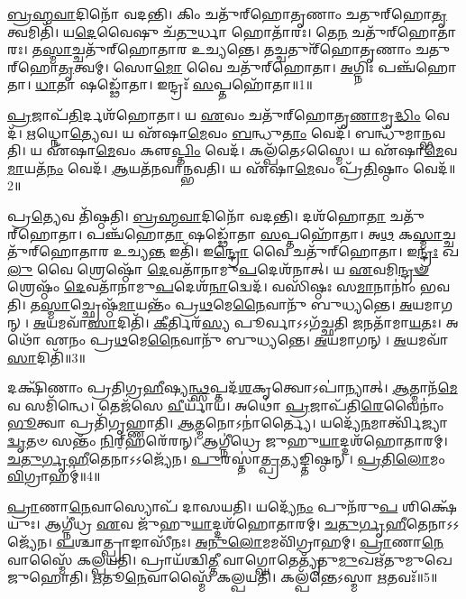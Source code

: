 \setcounter{anuvakam}{0}

\-\ul{𑌬𑍍𑌰}\-\-\ul{𑌹𑍍𑌮}\-\-\ul{𑌵𑌾}\-𑌦𑌿𑌨𑍋᳴ 𑌵𑌦𑌨𑍍𑌤𑌿।
𑌕𑌿𑌂 𑌚𑌤𑍁᳴𑌰𑍍‌\mbox{}𑌹𑍋𑌤𑍃𑌣𑌾𑌂 𑌚𑌤𑍁𑌰𑍍‌\mbox{}𑌹𑍋\-\ul{𑌤𑍃}\-𑌤𑍍𑌵𑌮𑌿𑌤𑌿᳴।
𑌯\-\ul{𑌦𑍇}\-𑌵𑍈𑌷𑍁 𑌚᳴\-\ul{𑌤𑍁}\-𑌰𑍍𑌧𑌾 𑌹𑍋𑌤𑌾᳴𑌰𑌃।
𑌤𑍇\-\ul{𑌨} 𑌚𑌤𑍁᳴𑌰𑍍‌\mbox{}𑌹𑍋𑌤𑌾𑌰𑌃।
𑌤\-\ul{𑌸𑍍𑌮𑌾}\-𑌚𑍍𑌚𑌤𑍁᳴𑌰𑍍‌\mbox{}𑌹𑍋𑌤𑌾𑌰 𑌉𑌚𑍍𑌯𑌨𑍍𑌤𑍇।
𑌤𑌚𑍍𑌚𑌤𑍁𑌰𑍍᳴𑌹𑍋𑌤𑍃𑌣𑌾𑌂 𑌚𑌤𑍁𑌰𑍍‌\mbox{}𑌹𑍋\-\ul{𑌤𑍃}\-𑌤𑍍𑌵𑌮𑍍।
𑌸𑍋\-\ul{𑌮𑍋} 𑌵𑍈 𑌚𑌤𑍁᳴𑌰𑍍‌\mbox{}𑌹𑍋𑌤𑌾।
\-\ul{𑌅}\-𑌗𑍍𑌨𑌿𑌃 𑌪𑌞𑍍𑌚᳴𑌹𑍋𑌤𑌾।
\-\ul{𑌧𑌾}\-𑌤𑌾 𑌷𑌡𑍍𑌢𑍋᳴𑌤𑌾।
𑌇𑌨𑍍𑌦𑍍𑌰𑌃᳴ \ul{𑌸}\-𑌪𑍍𑌤𑌹𑍋᳴𑌤𑌾॥1॥

\-\ul{𑌪𑍍𑌰}\-𑌜𑌾𑌪᳴\-\ul{𑌤𑌿}\-𑌰𑍍𑌦𑌶᳴𑌹𑍋𑌤𑌾।
𑌯 \ul{𑌏}\-𑌵𑌂 𑌚𑌤𑍁᳴𑌰𑍍‌\mbox{}𑌹𑍋𑌤𑍃\-\ul{𑌣𑌾}\-𑌮𑍃\-\ul{𑌦𑍍𑌧𑌿𑌂} 𑌵𑍇𑌦᳴।
\-\ul{𑌋}\-𑌧𑍍𑌨𑍋\-\ul{𑌤𑍍𑌯𑍇}\-𑌵।
𑌯 𑌏᳴𑌷𑌾\-\ul{𑌮𑍇}\-𑌵𑌂 \ul{𑌬}\-𑌨𑍍𑌧𑍁\-\ul{𑌤𑌾𑌂} 𑌵𑍇𑌦᳴।
𑌬𑌨𑍍𑌧𑍁᳴𑌮𑌾𑌨𑍍𑌭𑌵𑌤𑌿।
𑌯 𑌏᳴𑌷𑌾\-\ul{𑌮𑍇}\-𑌵𑌂 𑌕𑍢\-\ul{𑌪𑍍𑌤𑌿𑌂} 𑌵𑍇𑌦᳴।
𑌕𑌲𑍍𑌪᳴𑌤𑍇\-𑌽𑌸𑍍𑌮𑍈।
𑌯 𑌏᳴𑌷𑌾\-\ul{𑌮𑍇}\-𑌵\-\ul{𑌮𑌾}\-𑌯𑌤᳴\-\ul{𑌨𑌂} 𑌵𑍇𑌦᳴।
\-\ul{𑌆}\-𑌯𑌤᳴𑌨𑌵𑌾𑌨𑍍𑌭𑌵𑌤𑌿।
𑌯 𑌏᳴𑌷𑌾\-\ul{𑌮𑍇}\-𑌵𑌂 𑌪𑍍𑌰᳴\-\ul{𑌤𑌿}\-𑌷𑍍𑌠𑌾𑌂 𑌵𑍇𑌦᳴॥2॥

𑌪𑍍𑌰\-\ul{𑌤𑍍𑌯𑍇}\-𑌵 𑌤𑌿᳴𑌷𑍍𑌠𑌤𑌿।
\-\ul{𑌬𑍍𑌰}\-\-\ul{𑌹𑍍𑌮}\-\-\ul{𑌵𑌾}\-𑌦𑌿𑌨𑍋᳴ 𑌵𑌦𑌨𑍍𑌤𑌿।
𑌦𑌶᳴𑌹𑍋\-\ul{𑌤𑌾} 𑌚𑌤𑍁᳴𑌰𑍍‌\mbox{}𑌹𑍋𑌤𑌾।
𑌪𑌞𑍍𑌚᳴𑌹𑍋\-\ul{𑌤𑌾} 𑌷𑌡𑍍𑌢𑍋᳴𑌤𑌾 \ul{𑌸}\-𑌪𑍍𑌤𑌹𑍋᳴𑌤𑌾।
𑌅\-\ul{𑌥} 𑌕\-\ul{𑌸𑍍𑌮𑌾}\-𑌚𑍍𑌚𑌤𑍁᳴𑌰𑍍‌\mbox{}𑌹𑍋𑌤𑌾𑌰 𑌉𑌚𑍍𑌯\-\ul{𑌨𑍍𑌤} 𑌇𑌤𑌿᳴।
𑌇\-\ul{𑌨𑍍𑌦𑍍𑌰𑍋} 𑌵𑍈 𑌚𑌤𑍁᳴𑌰𑍍‌\mbox{}𑌹𑍋𑌤𑌾।
𑌇\-\ul{𑌨𑍍𑌦𑍍𑌰𑌃} 𑌖\-\ul{𑌲𑍁} 𑌵𑍈 𑌶𑍍𑌰𑍇𑌷𑍍𑌠𑍋᳴ \ul{𑌦𑍇}\-𑌵𑌤𑌾᳴𑌨𑌾𑌮𑍁\-\ul{𑌪}\-\-𑌦𑍇𑌶᳴𑌨𑌾𑌤𑍍।
𑌯 \ul{𑌏}\-𑌵𑌮𑌿\-\ul{𑌨𑍍𑌦𑍍𑌰}\-\-\ul{𑍟} 𑌶𑍍𑌰𑍇𑌷𑍍𑌠𑌂᳴ \ul{𑌦𑍇}\-𑌵𑌤𑌾᳴𑌨𑌾𑌮𑍁\-\ul{𑌪}\-\-𑌦𑍇𑌶᳴\-\ul{𑌨𑌾}\-𑌦𑍍𑌵𑍇𑌦᳴।
𑌵𑌸𑌿᳴𑌷𑍍𑌠𑌃 𑌸\-\ul{𑌮𑌾}\-𑌨𑌾𑌨𑌾𑌂॑ 𑌭𑌵𑌤𑌿।
𑌤\-\ul{𑌸𑍍𑌮𑌾}\-𑌚𑍍𑌛𑍍𑌰𑍇𑌷𑍍𑌠᳴\-\ul{𑌮𑌾}\-𑌯𑌨𑍍𑌤𑌂᳴ 𑌪𑍍𑌰\-\ul{𑌥}\-𑌮𑍇\-\ul{𑌨𑍈}\-𑌵𑌾𑌨𑍁᳴ 𑌬𑍁𑌧𑍍𑌯𑌨𑍍𑌤𑍇।
\-\ul{𑌅}\-𑌯𑌮𑌾𑌗𑌨𑍍।
\-\ul{𑌅}\-𑌯𑌮𑌵𑌾᳴\-\ul{𑌸𑌾}\-𑌦𑌿𑌤𑌿᳴।
\-\ul{𑌕𑍀}\-𑌰𑍍𑌤𑌿𑌰᳴\-\ul{𑌸𑍍𑌯} 𑌪𑍂𑌰𑍍𑌵𑌾\-𑌽𑌽𑌗᳴𑌚𑍍𑌛𑌤𑌿 \ul{𑌜}\-𑌨𑌤𑌾᳴𑌮𑌾\-\ul{𑌯}\-𑌤𑌃।
𑌅𑌥𑍋᳴ 𑌏𑌨𑌂 𑌪𑍍𑌰\-\ul{𑌥}\-𑌮𑍇\-\ul{𑌨𑍈}\-𑌵𑌾𑌨𑍁᳴ 𑌬𑍁𑌧𑍍𑌯𑌨𑍍𑌤𑍇।
\-\ul{𑌅}\-𑌯𑌮𑌾𑌗𑌨𑍍।
\-\ul{𑌅}\-𑌯𑌮𑌵𑌾᳴\-\ul{𑌸𑌾}\-𑌦𑌿𑌤𑌿᳴॥3॥\anuvakamend[\-\ul{𑌸}\-𑌪𑍍𑌤𑌹𑍋᳴𑌤𑌾 𑌪𑍍𑌰\-\ul{𑌤𑌿}\-𑌷𑍍𑌠𑌾𑌂 𑌵𑍇𑌦᳴ 𑌬𑍁𑌧𑍍𑌯\-\ul{𑌨𑍍𑌤𑍇} 𑌷𑌟𑍍𑌚᳴]

𑌦𑌕𑍍𑌷𑌿᳴𑌣𑌾𑌂 𑌪𑍍𑌰𑌤𑌿𑌗𑍍𑌰\-\ul{𑌹𑍀}\-𑌷𑍍𑌯\-\ul{𑌨𑍍𑌥𑍍𑌸}\-𑌪𑍍𑌤𑌦᳴\-\ul{𑌶}\-𑌕𑍃𑌤𑍍𑌵𑍋\-𑌽𑌪𑌾॑𑌨𑍍𑌯𑌾𑌤𑍍।
\-\ul{𑌆}\-𑌤𑍍𑌮𑌾𑌨᳴\-\ul{𑌮𑍇}\-𑌵 𑌸𑌮𑌿᳴𑌨𑍍𑌧𑍇।
𑌤𑍇𑌜᳴𑌸𑍇 \ul{𑌵𑍀}\-𑌰𑍍𑌯𑌾᳴𑌯।
𑌅𑌥𑍋॑ \ul{𑌪𑍍𑌰}\-𑌜𑌾𑌪᳴𑌤𑌿\-\ul{𑌰𑍇}\-𑌵𑍈𑌨𑌾𑌂॑ \ul{𑌭𑍂}\-𑌤𑍍𑌵𑌾 𑌪𑍍𑌰𑌤𑌿᳴\-𑌗𑍃𑌹𑍍𑌣𑌾𑌤𑌿।
\-\ul{𑌆}\-𑌤𑍍𑌮𑌨𑍋\-𑌽𑌨𑌾॑𑌰𑍍𑌤𑍍𑌯𑍈।
𑌯𑌦𑍍𑌯𑍇᳴\-\ul{𑌨}\-𑌮𑌾𑌰𑍍𑌤𑍍𑌵𑌿᳴𑌜𑍍𑌯𑌾\-\ul{𑌦𑍍𑌵𑍃}\-𑌤𑍞 𑌸𑌨𑍍𑌤𑌂᳴ \ul{𑌨𑌿}\-𑌰𑍍‌॒\mbox{}𑌹𑌰𑍇᳴𑌰𑌨𑍍।
𑌆𑌗𑍍𑌨𑍀॑𑌧𑍍𑌰𑍇 𑌜𑍁𑌹𑍁\-\ul{𑌯𑌾}\-𑌦𑍍𑌦𑌶᳴𑌹𑍋𑌤𑌾𑌰𑌮𑍍।
\-\ul{𑌚}\-\-\ul{𑌤𑍁}\-\-\ul{𑌰𑍍𑌗𑍃}\-\-\ul{𑌹𑍀}\-𑌤𑍇𑌨𑌾𑌽𑌽𑌜𑍍𑌯𑍇᳴𑌨।
\-\ul{𑌪𑍁}\-𑌰𑌸𑍍𑌤𑌾॑\-\ul{𑌤𑍍𑌪𑍍𑌰}\-𑌤𑍍𑌯𑌙𑍍𑌤𑌿𑌷𑍍𑌠𑌨𑍍।
\-\ul{𑌪𑍍𑌰}\-\-\ul{𑌤𑌿}\-\-\ul{𑌲𑍋}\-𑌮𑌂 \ul{𑌵𑌿}\-𑌗𑍍𑌰𑌾𑌹𑌮𑍍॑॥4॥

\-\ul{𑌪𑍍𑌰𑌾}\-𑌣𑌾\-\ul{𑌨𑍇}\-𑌵𑌾𑌸𑍍𑌯𑍋𑌪᳴ 𑌦𑌾𑌸𑌯𑌤𑌿।
𑌯𑌦𑍍𑌯𑍇᳴\-\ul{𑌨𑌂} 𑌪𑍁𑌨᳴𑌰𑍁\-\ul{𑌪} 𑌶𑌿𑌕𑍍𑌷𑍇᳴𑌯𑍁𑌃।
𑌆𑌗𑍍𑌨𑍀॑𑌧𑍍𑌰 \ul{𑌏}\-𑌵 𑌜𑍁᳴𑌹𑍁\-\ul{𑌯𑌾}\-𑌦𑍍𑌦𑌶᳴𑌹𑍋𑌤𑌾𑌰𑌮𑍍।
\-\ul{𑌚}\-\-\ul{𑌤𑍁}\-\-\ul{𑌰𑍍𑌗𑍃}\-\-\ul{𑌹𑍀}\-𑌤𑍇𑌨𑌾𑌽𑌽𑌜𑍍𑌯𑍇᳴𑌨।
\-\ul{𑌪}\-𑌶𑍍𑌚𑌾𑌤𑍍𑌪𑍍𑌰𑌾𑌙𑌾𑌸𑍀᳴𑌨𑌃।
\-\ul{𑌅}\-\-\ul{𑌨𑍁}\-\-\ul{𑌲𑍋}\-𑌮𑌮𑌵𑌿᳴𑌗𑍍𑌰𑌾𑌹𑌮𑍍।
\-\ul{𑌪𑍍𑌰𑌾}\-𑌣𑌾\-\ul{𑌨𑍇}\-𑌵𑌾𑌸𑍍𑌮𑍈᳴ 𑌕𑌲𑍍𑌪𑌯𑌤𑌿।
𑌪𑍍𑌰𑌾𑌯᳴𑌶𑍍𑌚𑌿\-\ul{𑌤𑍍𑌤𑍀} 𑌵𑌾𑌗𑍍𑌘𑍋𑌤𑍇𑌤𑍍𑌯𑍃᳴𑌤𑍁\-\ul{𑌮𑍁}\-𑌖𑌋᳴𑌤𑍁𑌮𑍁𑌖𑍇 𑌜𑍁𑌹𑍋𑌤𑌿।
\-\ul{𑌋}\-𑌤𑍂\-\ul{𑌨𑍇}\-𑌵𑌾𑌸𑍍𑌮𑍈᳴ 𑌕𑌲𑍍𑌪𑌯𑌤𑌿।
𑌕𑌲𑍍𑌪᳴𑌨𑍍𑌤𑍇\-𑌽𑌸𑍍𑌮𑌾 \ul{𑌋}\-𑌤𑌵𑌃᳴॥5॥


